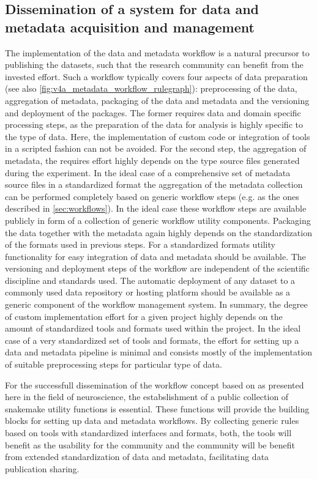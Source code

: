 \subsection{Dissemination of a system for data and metadata acquisition and management}
The implementation of the data and metadata workflow is a natural precursor to publishing the datasets, such that the research community can benefit from the invested effort. Such a workflow typically covers four aspects of data preparation (see also \cref{fig:v4a_metadata_workflow_rulegraph}): preprocessing of the data, aggregation of metadata, packaging of the data and metadata and the versioning and deployment of the packages. The former requires data and domain specific processing steps, as the preparation of the data for analysis is highly specific to the type of data. Here, the implementation of custom code or integration of tools in a scripted fashion can not be avoided. For the second step, the aggregation of metadata, the requires effort highly depends on the type source files generated during the experiment. In the ideal case of a comprehensive set of metadata source files in a standardized format the aggregation of the metadata collection can be performed completely based on generic workflow steps (e.g. as the ones described in \ref{sec:workflows}). In the ideal case these workflow steps are available publicly in form of a collection of generic workflow utility components. Packaging the data together with the metadata again highly depends on the standardization of the formats used in previous steps. For a standardized formats utility functionality for easy integration of data and metadata should be available. The versioning and deployment steps of the workflow are independent of the scientific discipline and standards used. The automatic deployment of any dataset to a commonly used data repository or hosting platform should be available as a generic component of the workflow management system. In summary, the degree of custom implementation effort for a given project highly depends on the amount of standardized tools and formats used within the project. In the ideal case of a very standardized set of tools and formats, the effort for setting up a data and metadata pipeline is minimal and consists mostly of the implementation of suitable preprocessing steps for particular type of data. 

For the successfull dissemination of the workflow concept based on   as presented here in the field of neuroscience, the estabslishment of a public collection of snakemake utility functions is essential. These functions will provide the building blocks for setting up data and metadata workflows. By collecting generic rules based on tools with standardized interfaces and formats, both, the tools will benefit as  the usability for the community and the community will be benefit from extended standardization of data and metadata, facilitating data publication sharing.


